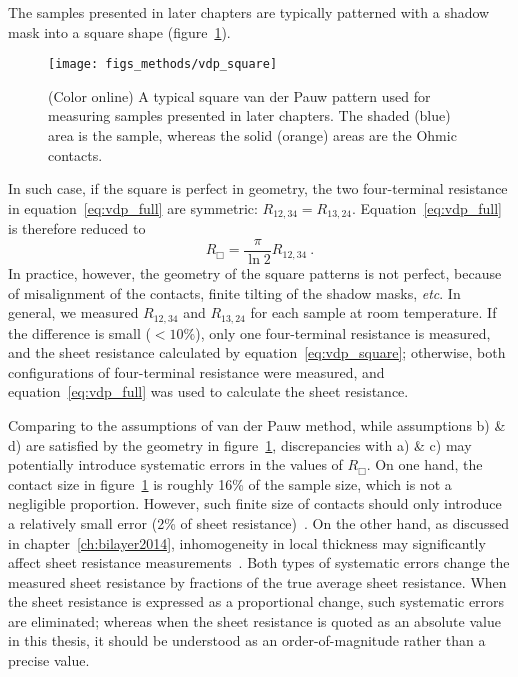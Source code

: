 The samples presented in later chapters are typically patterned with a shadow mask into a square shape (figure~\ref{fig:vdp_square}). %
\begin{figure}[ht]%
	\centering%
    \texttt{[image: figs\_methods/vdp\_square]}%
    \caption[A square van der Pauw pattern]{\label{fig:vdp_square}(Color online) A typical square van der Pauw pattern used for measuring samples presented in later chapters. The shaded (blue) area is the sample, whereas the solid (orange) areas are the Ohmic contacts.}%
\end{figure}%
In such case, if the square is perfect in geometry, the two four-terminal resistance in equation~\ref{eq:vdp_full} are symmetric: $R_{12,34} = R_{13,24}$. Equation~\ref{eq:vdp_full} is therefore reduced to%
\begin{equation}\label{eq:vdp_square}
	{R_\Box} = \frac{\pi}{\ln{2}}R_{12,34}~.
\end{equation}%
In practice, however, the geometry of the square patterns is not perfect, because of misalignment of the contacts, finite tilting of the shadow masks, \textit{etc}. In general, we measured $R_{12,34}$ and $R_{13,24}$ for each sample at room temperature. If the difference is small ($<10\%$), only one four-terminal resistance is measured, and the sheet resistance calculated by equation~\ref{eq:vdp_square}; otherwise, both configurations of four-terminal resistance were measured, and equation~\ref{eq:vdp_full} was used to calculate the sheet resistance.

Comparing to the assumptions of van der Pauw method, while assumptions b) \& d) are satisfied by the geometry in figure~\ref{fig:vdp_square}, discrepancies with a) \& c) may potentially introduce systematic errors in the values of $R_\Box$. On one hand, the contact size in figure~\ref{fig:vdp_square} is roughly 16\% of the sample size, which is not a negligible proportion. However, such finite size of contacts should only introduce a relatively small error (2\% of sheet resistance)~\cite{VdP_contact_size}. On the other hand, as discussed in chapter~\ref{ch:bilayer2014}, inhomogeneity in local thickness may significantly affect sheet resistance measurements~\cite{Landauer_Porous_Media}. Both types of systematic errors change the measured sheet resistance by fractions of the true average sheet resistance. When the sheet resistance is expressed as a proportional change, such systematic errors are eliminated; whereas when the sheet resistance is quoted as an absolute value in this thesis, it should be understood as an order-of-magnitude rather than a precise value.